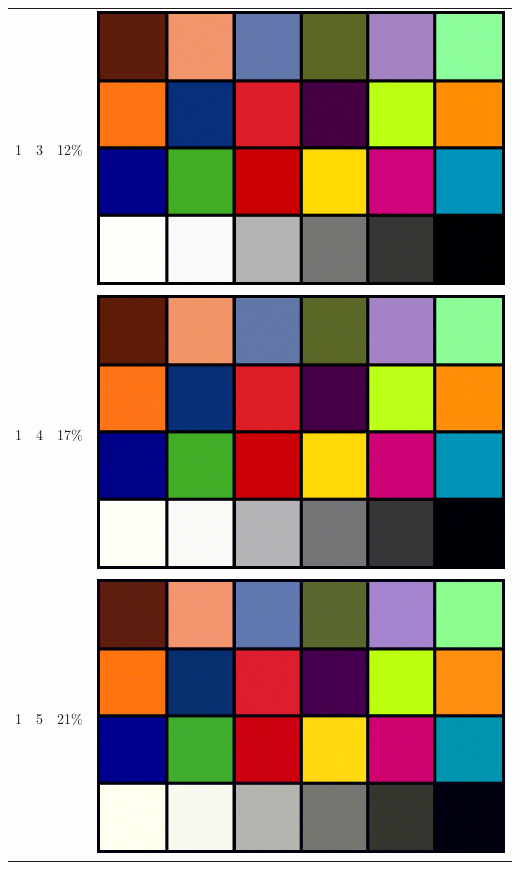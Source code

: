 \documentclass[times, utf8, seminar, numeric]{fer}
\begin{document}
\begin{center}
\begin{longtable}{|c|c|c|c|}
1 & 3 &12\% & \includegraphics[scale=0.3]{../benchmark_results/color_chart/1_components-3_bits.png} \\
1 & 4 &17\% & \includegraphics[scale=0.3]{../benchmark_results/color_chart/1_components-4_bits.png} \\
1 & 5 &21\% & \includegraphics[scale=0.3]{../benchmark_results/color_chart/1_components-5_bits.png} \\

\end{longtable}
\end{center}
\end{document}
